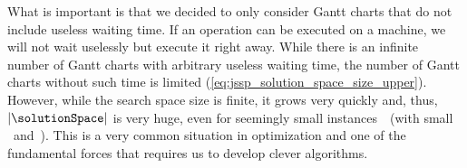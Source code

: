What is important is that we decided to only consider Gantt charts that do not include useless waiting time.
If an operation can be executed on a machine, we will not wait uselessly but execute it right away.
While there is an infinite number of Gantt charts with arbitrary useless waiting time, the number of Gantt charts without such time is limited (\autoref{eq:jssp_solution_space_size_upper}).
However, while the search space size is finite, it grows very quickly and, thus, $|\solutionSpace|$ is very huge, even for seemingly small instances~\instance\ (with small \jsspMachines\ and~\jsspJobs).
This is a very common situation in optimization and one of the fundamental forces that requires us to develop clever algorithms.%
%
%
%
\endhsection%
\endhsection%
%
